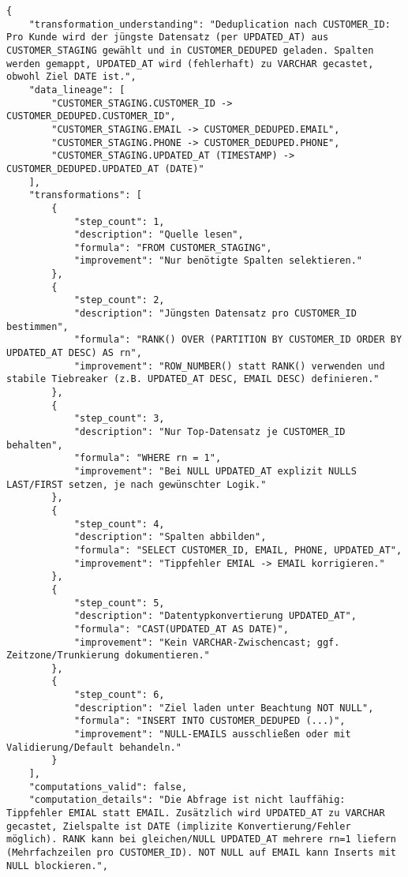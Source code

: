 \begin{lstlisting}[caption={Ausgabe: GPT-5 Anwendungsfall 2 Konsistenzdurchlauf},label={gpt_case2_prompt2}]
{
    "transformation_understanding": "Deduplication nach CUSTOMER_ID: Pro Kunde wird der jüngste Datensatz (per UPDATED_AT) aus CUSTOMER_STAGING gewählt und in CUSTOMER_DEDUPED geladen. Spalten werden gemappt, UPDATED_AT wird (fehlerhaft) zu VARCHAR gecastet, obwohl Ziel DATE ist.",
    "data_lineage": [
        "CUSTOMER_STAGING.CUSTOMER_ID -> CUSTOMER_DEDUPED.CUSTOMER_ID",
        "CUSTOMER_STAGING.EMAIL -> CUSTOMER_DEDUPED.EMAIL",
        "CUSTOMER_STAGING.PHONE -> CUSTOMER_DEDUPED.PHONE",
        "CUSTOMER_STAGING.UPDATED_AT (TIMESTAMP) -> CUSTOMER_DEDUPED.UPDATED_AT (DATE)"
    ],
    "transformations": [
        {
            "step_count": 1,
            "description": "Quelle lesen",
            "formula": "FROM CUSTOMER_STAGING",
            "improvement": "Nur benötigte Spalten selektieren."
        },
        {
            "step_count": 2,
            "description": "Jüngsten Datensatz pro CUSTOMER_ID bestimmen",
            "formula": "RANK() OVER (PARTITION BY CUSTOMER_ID ORDER BY UPDATED_AT DESC) AS rn",
            "improvement": "ROW_NUMBER() statt RANK() verwenden und stabile Tiebreaker (z.B. UPDATED_AT DESC, EMAIL DESC) definieren."
        },
        {
            "step_count": 3,
            "description": "Nur Top-Datensatz je CUSTOMER_ID behalten",
            "formula": "WHERE rn = 1",
            "improvement": "Bei NULL UPDATED_AT explizit NULLS LAST/FIRST setzen, je nach gewünschter Logik."
        },
        {
            "step_count": 4,
            "description": "Spalten abbilden",
            "formula": "SELECT CUSTOMER_ID, EMAIL, PHONE, UPDATED_AT",
            "improvement": "Tippfehler EMIAL -> EMAIL korrigieren."
        },
        {
            "step_count": 5,
            "description": "Datentypkonvertierung UPDATED_AT",
            "formula": "CAST(UPDATED_AT AS DATE)",
            "improvement": "Kein VARCHAR-Zwischencast; ggf. Zeitzone/Trunkierung dokumentieren."
        },
        {
            "step_count": 6,
            "description": "Ziel laden unter Beachtung NOT NULL",
            "formula": "INSERT INTO CUSTOMER_DEDUPED (...)",
            "improvement": "NULL-EMAILS ausschließen oder mit Validierung/Default behandeln."
        }
    ],
    "computations_valid": false,
    "computation_details": "Die Abfrage ist nicht lauffähig: Tippfehler EMIAL statt EMAIL. Zusätzlich wird UPDATED_AT zu VARCHAR gecastet, Zielspalte ist DATE (implizite Konvertierung/Fehler möglich). RANK kann bei gleichen/NULL UPDATED_AT mehrere rn=1 liefern (Mehrfachzeilen pro CUSTOMER_ID). NOT NULL auf EMAIL kann Inserts mit NULL blockieren.",

\end{lstlisting}
